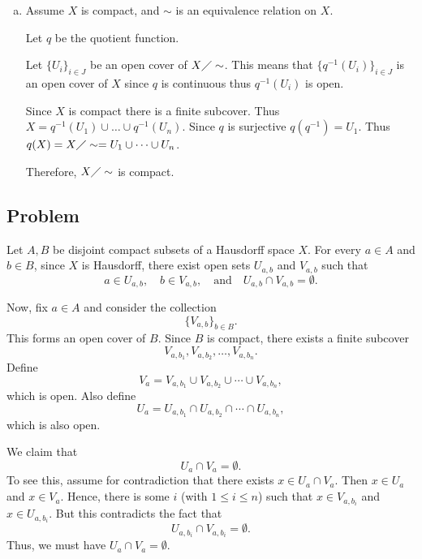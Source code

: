 \documentclass[12pt, letterpaper]{article}
\newcounter{problem}
\newcommand{\q}{
    \newpage %
    \stepcounter{problem} %
    \subsection*{Problem \arabic{problem}} %
}
\begin{document}
\begin{enumerate}[(a)]
    This is a continuous function thus $f \circ \varphi$ is continuous. Also $f \circ \varphi(0)=f(c)=a$ and $f \circ \varphi(1)=f(d)=a$

    Do something similar for $g$. Call these new functions $\bar{g},\bar{f}$.

    Consider $h: [0,1] \to X \times Y$ s.t. $h(t)=(\bar{g},\bar{f})$. $h$ is continuous since $\bar{g}$ and $\bar{f}$ are continuous.

    Thus, $h(0)=(\bar{g}(0),\bar{f}(0))=(x,y)$ and $h(1)=(\bar{g}(1),\bar{f}(1))=(a,b)$

    Therefore, $X \times Y$ is path connected.

    \item Assume $X$ is compact, and $\sim$ is an equivalence relation on $X$.
    
    Let $q$ be the quotient function.

    Let $\{U_i\}_{i \in J}$ be an open cover of $X \diagup \sim$. This means that $\{q^{-1}(U_i)\}_{i \in J}$ is an open cover of $X$ since $q$ is continuous thus $q^{-1}(U_i)$ is open.

    Since $X$ is compact there is a finite subcover. Thus $X=q^{-1}(U_1) \cup \dots \cup q^{-1}(U_n)$. Since $q$ is surjective $q(q^{-1})=U_1$. Thus $q(X)=X \diagup \sim = U_1 \cup \dots \cup U_n$.

    Therefore, $X \diagup \sim$ is compact.
\end{enumerate}

\q
Let \( A, B \) be disjoint compact subsets of a Hausdorff space \( X \). For every \( a \in A \) and \( b \in B \), since \( X \) is Hausdorff, there exist open sets \( U_{a,b} \) and \( V_{a,b} \) such that 
\[
a \in U_{a,b}, \quad b \in V_{a,b}, \quad \text{and} \quad U_{a,b} \cap V_{a,b} = \emptyset.
\]

Now, fix \( a \in A \) and consider the collection 
\[
\{ V_{a,b} \}_{b \in B}.
\]
This forms an open cover of \( B \). Since \( B \) is compact, there exists a finite subcover
\[
V_{a,b_1}, V_{a,b_2}, \dots, V_{a,b_n}.
\]
Define
\[
V_a = V_{a,b_1} \cup V_{a,b_2} \cup \cdots \cup V_{a,b_n},
\]
which is open. Also define
\[
U_a = U_{a,b_1} \cap U_{a,b_2} \cap \cdots \cap U_{a,b_n},
\]
which is also open.

We claim that
\[
U_a \cap V_a = \emptyset.
\]
To see this, assume for contradiction that there exists \( x \in U_a \cap V_a \). Then \( x \in U_a \) and \( x \in V_a \). Hence, there is some \( i \) (with \( 1 \le i \le n \)) such that \( x \in V_{a,b_i} \) and \( x \in U_{a,b_i} \). But this contradicts the fact that 
\[
U_{a,b_i} \cap V_{a,b_i} = \emptyset.
\]
Thus, we must have \( U_a \cap V_a = \emptyset \).
\end{document}
